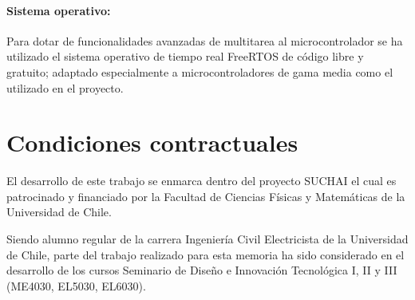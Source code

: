 \documentclass[11pt,letterpaper]{article}
\begin{document}
\paragraph{Sistema operativo:}
Para dotar de funcionalidades avanzadas de multitarea al microcontrolador se ha utilizado el sistema operativo de tiempo real FreeRTOS de código libre y gratuito; adaptado especialmente a microcontroladores de gama media como el utilizado en el proyecto.

\section{Condiciones contractuales}
El desarrollo de este trabajo se enmarca dentro del proyecto SUCHAI el cual es patrocinado y financiado por la Facultad de Ciencias Físicas y Matemáticas de la Universidad de Chile.

Siendo alumno regular de la carrera Ingeniería Civil Electricista de la Universidad de Chile, parte del trabajo realizado para esta memoria ha sido considerado en el desarrollo de los cursos Seminario de Diseño e Innovación Tecnológica I, II y III (ME4030, EL5030, EL6030).


% 	
\end{document}
